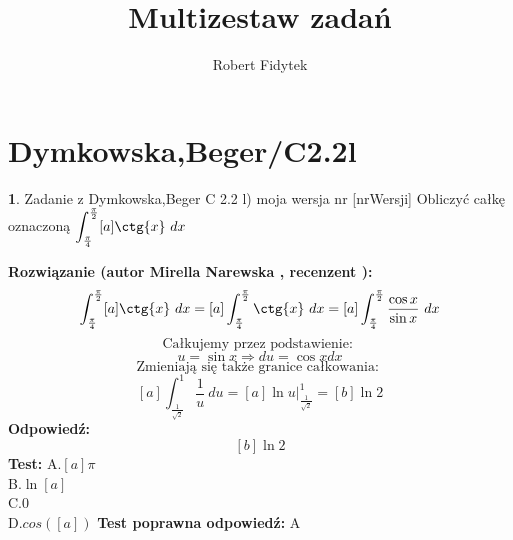 \documentclass[12pt, a4paper]{article}
\title{Multizestaw zadań}
\author{Robert Fidytek}
\date{}
\theoremstyle{definition} %
\newtheorem{zad}{}
\newcommand{\kategoria}[1]{\section{#1}} %
\newcommand{\zadStart}[1]{\begin{zad}#1\newline} %
\newcommand{\zadStop}{\end{zad}}   %
\newcommand{\rozwStart}[2]{\noindent \textbf{Rozwiązanie (autor #1 , recenzent #2): }\newline} %
\newcommand{\odpStart}{\noindent \textbf{Odpowiedź:}\newline}    %
\newcommand{\odpStop}{\newline}                                             %
\newcommand{\testStart}{\noindent \textbf{Test:}\newline} %
\newcommand{\testStop}{\newline} %
\newcommand{\kluczStart}{\noindent \textbf{Test poprawna odpowiedź:}\newline} %
\newcommand{\kluczStop}{\newline} %
\begin{document}
\maketitle



\kategoria{Dymkowska,Beger/C2.2l}
\zadStart{Zadanie z Dymkowska,Beger C 2.2 l) moja wersja nr [nrWersji]}
Obliczyć całkę oznaczoną $\displaystyle \int_{\frac{\pi}{4}}^{\frac{\pi}{2}} [a]\ctg{x}  \ dx $
\zadStop
\rozwStart{Mirella Narewska}{}
$$\int_{\frac{\pi}{4}}^{\frac{\pi}{2}} [a]\ctg{x}  \ dx= [a]\int_{\frac{\pi}{4}}^{\frac{\pi}{2}} \ctg{x}  \ dx =[a]\int_{\frac{\pi}{4}}^{\frac{\pi}{2}} \frac{\cos{x}}{\sin{x}}  \ dx$$
$$\text{Całkujemy przez podstawienie: }$$
$$u=\sin{x} \Rightarrow du=\cos{x} dx $$
$$\text{Zmieniają się także granice całkowania: }$$
$$[a]\int_{\frac{1}{\sqrt{2}}}^{1} \frac{1}{u}  \ du=[a]\ln{u}|_{\frac{1}{\sqrt{2}}}^{1}=[b]\ln{2}$$
\odpStart
$$[b]\ln{2}$$
\odpStop
\testStart
A.$[a]\pi$
\\
B.$\ln{[a]}$
\\
C.$0$
\\
D.$cos([a])$
\testStop
\kluczStart
A
\kluczStop
\end{document}
